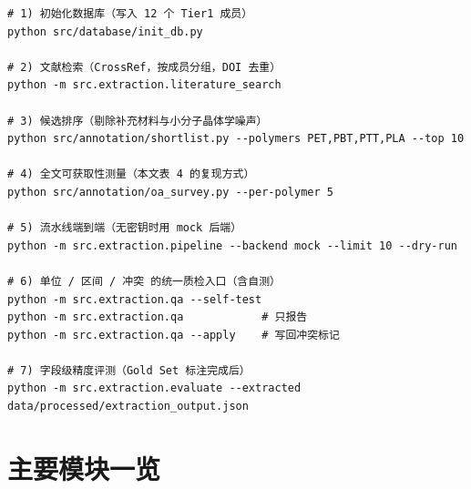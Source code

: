 \documentclass[11pt,a4paper]{ctexart}
\begin{document}
\begin{lstlisting}[style=common]
# 1) 初始化数据库（写入 12 个 Tier1 成员）
python src/database/init_db.py

# 2) 文献检索（CrossRef，按成员分组，DOI 去重）
python -m src.extraction.literature_search

# 3) 候选排序（剔除补充材料与小分子晶体学噪声）
python src/annotation/shortlist.py --polymers PET,PBT,PTT,PLA --top 10

# 4) 全文可获取性测量（本文表 4 的复现方式）
python src/annotation/oa_survey.py --per-polymer 5

# 5) 流水线端到端（无密钥时用 mock 后端）
python -m src.extraction.pipeline --backend mock --limit 10 --dry-run

# 6) 单位 / 区间 / 冲突 的统一质检入口（含自测）
python -m src.extraction.qa --self-test
python -m src.extraction.qa            # 只报告
python -m src.extraction.qa --apply    # 写回冲突标记

# 7) 字段级精度评测（Gold Set 标注完成后）
python -m src.extraction.evaluate --extracted data/processed/extraction_output.json
\end{lstlisting}

\section{主要模块一览}
\end{document}

